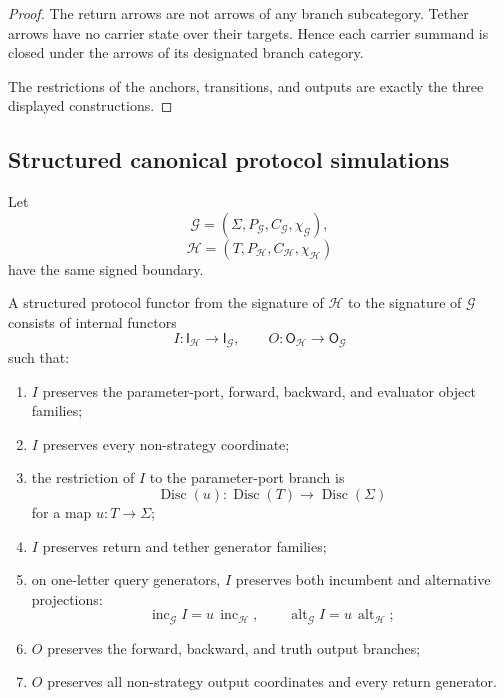 \begin{proof}
The return arrows are not arrows of any branch subcategory. Tether arrows have no carrier state over
their targets. Hence each carrier summand is closed under the arrows of its designated branch
category.

The restrictions of the anchors, transitions, and outputs are exactly the three displayed
constructions.
\end{proof}

\subsection{Structured canonical protocol simulations}

Let
\[
  \mathcal G=(\Sigma,P_{\mathcal G},C_{\mathcal G},\chi_{\mathcal G}),
\]
\[
  \mathcal H=(T,P_{\mathcal H},C_{\mathcal H},\chi_{\mathcal H})
\]
have the same signed boundary.

\begin{definition}
\label{def:structured-protocol-functor}
A structured protocol functor from the signature of \(\mathcal H\) to the signature of
\(\mathcal G\) consists of internal functors
\[
  I:\mathsf I_{\mathcal H}\to\mathsf I_{\mathcal G},
  \qquad
  O:\mathsf O_{\mathcal H}\to\mathsf O_{\mathcal G}
\]
such that:
\begin{enumerate}
  \item \(I\) preserves the parameter-port, forward, backward, and evaluator object families;
  \item \(I\) preserves every non-strategy coordinate;
  \item the restriction of \(I\) to the parameter-port branch is
  \[
    \operatorname{Disc}(u):
    \operatorname{Disc}(T)\to\operatorname{Disc}(\Sigma)
  \]
  for a map \(u:T\to\Sigma\);
  \item \(I\) preserves return and tether generator families;
  \item on one-letter query generators, \(I\) preserves both incumbent and alternative projections:
  \[
    \operatorname{inc}_{\mathcal G}I
    =
    u\,\operatorname{inc}_{\mathcal H},
    \qquad
    \operatorname{alt}_{\mathcal G}I
    =
    u\,\operatorname{alt}_{\mathcal H};
  \]
  \item \(O\) preserves the forward, backward, and truth output branches;
  \item \(O\) preserves all non-strategy output coordinates and every return generator.
\end{enumerate}
\end{definition}


